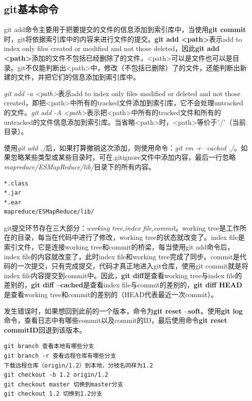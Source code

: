\subsection{git基本命令}
\par git add命令主要用于把要提交的文件的信息添加到索引库中，当使用\textbf{git commit}时，git将依据索引库中的内容来进行文件的提交。\textbf{git add <path>}表示add to index only files created or modified and not those deleted，因此\textbf{git add <path>}添加的文件不包括已经删除了的文件，<path>可以是文件也可以是目录。git不仅能判断出<path>中，修改（不包括已删除）了的文件，还能判断出新建的文件，并把它们的信息添加到索引库中。
\par \textsl{git add -u <path>}表示add to index only files modified or deleted and not those created，即把<path>中所有的tracked文件添加到索引库，它不会处理untracked的文件。\textsl{git add -A <path>}表示把<path>中所有的tracked文件和所有的untracked的文件信息添加到索引库。当省略<path>时，<path>等价于'./'（当前目录）。
\par 使用\textsl{git add ./}后，如果打算撤销这次添加，则使用命令：\textsl{git rm -r --cached ./}。如果忽略某些类型或某些目录时，可在.gitignore文件中添加内容，最后一行忽略\textsl{mapreduce/ESMapReduce/lib/}目录下的所有内容。
\begin{verbatim}
*.class
*.jar
*.ear
mapreduce/ESMapReduce/lib/
\end{verbatim}
\par git提交环节存在三大部分：\textsl{working tree,index file,commit}。working tree是工作所在的目录，每当在代码中进行了修改，working tree的状态就改变了。index file是索引文件，它是连接working tree和commit的桥梁，每当使用git add命令后，index file的内容就改变了，此时index file和working tree完成了同步。commit是代码的一次提交，只有完成提交，代码才真正地进入git仓库，使用git commit就是将index file内容提交到commit中。因此，\textbf{git diff}是查看working tree与index file的差别的，\textbf{git diff --cached}是查看index file与commit的差别的，\textbf{git diff HEAD}是查看working tree和commit的差别的（HEAD代表最近一次commit）。
\par 发生错误时，如果想回到此前的一个版本，命令为\textbf{git reset --soft}。使用\textbf{git log}命令，查看日志中有哪些commit以及commit的ID，最后使用命令\textbf{git reset commitID}回退到该版本。
\begin{verbatim}
git branch 查看本地有哪些分支
git branch -r 查看远程仓库有哪些分支
下载远程仓库（origin/1.2）到本地，分枝名同样为1.2
git checkout -b 1.2 origin/1.2
git checkout master 切换到master分支
git checkout 1.2 切换到1.2分支
\end{verbatim}
